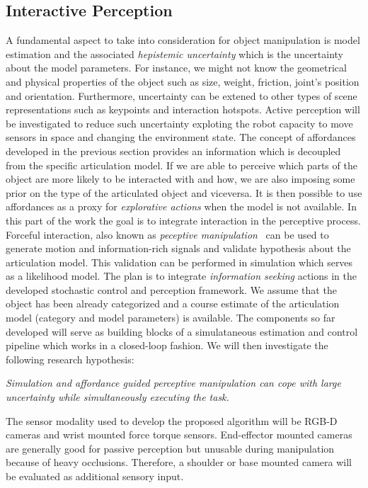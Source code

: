 \subsection{Interactive Perception}
A fundamental aspect to take into consideration for object manipulation is model estimation and the associated \emph{hepistemic uncertainty} which is the uncertainty about the model parameters. For instance, we might not know the geometrical and physical properties of the object such as size, weight, friction, joint's position and orientation. Furthermore, uncertainty can be extened to other types of scene representations such as keypoints and interaction hotspots. Active perception will be investigated to reduce such uncertainty exploting the robot capacity to move sensors in space and changing the environment state. The concept of affordances developed in the previous section provides an information which is decoupled from the specific articulation model. If we are able to perceive which parts of the object are more likely to be interacted with and how, we are also imposing some prior on the type of the articulated object and viceversa. It is then possible to use affordances as a proxy for \emph{explorative actions} when the model is not available. In this part of the work the goal is to integrate interaction in the perceptive process. Forceful interaction, also known as \emph{peceptive manipulation}~\cite{bohg2017interactive} can be used to generate motion and information-rich signals and validate hypothesis about the articulation model. This validation can be performed in simulation which serves as a likelihood model. The plan is to integrate \emph{information seeking} actions in the developed stochastic control and perception framework. We assume that the object has been already categorized and a course estimate of the articulation model (category and model parameters) is available. The components so far developed will serve as building blocks of a simulataneous estimation and control pipeline which works in a closed-loop fashion. We will then investigate the following research hypothesis:
\begin{displayquote}
\textit{Simulation and affordance guided perceptive manipulation can cope with large uncertainty while simultaneously executing the task.} 
\end{displayquote}
The sensor modality used to develop the proposed algorithm will be RGB-D cameras and wrist mounted force torque sensors. End-effector mounted cameras are generally good for passive perception but unusable during manipulation because of heavy occlusions. Therefore, a shoulder or base mounted camera will be evaluated as additional sensory input.  
 
